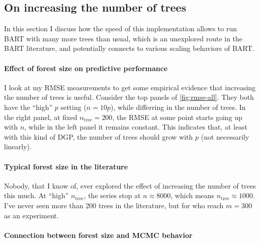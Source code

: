 \documentclass{article}
\let\oldmarginpar\marginpar
\renewcommand{\marginpar}[1]{\oldmarginpar{\sffamily\scriptsize #1}}
\renewcommand{\marginpar}[1]{\relax} %
\begin{document}
    \subsection{On increasing the number of trees}
    \label{sec:moretrees}

    In this section I discuss how the speed of this implementation allows to run BART with many more trees than usual, which is an unexplored route in the BART literature, and potentially connects to various scaling behaviors of BART.

    \paragraph{Effect of forest size on predictive performance}

    I look at my RMSE measurements to get some empirical evidence that increasing the number of trees is useful. Consider the top panels of \autoref{fig:rmse-all}. They both have the ``high'' $p$ setting ($n = 10p$), while differring in the number of trees. In the right panel, at fixed $n_\text{tree}=200$, the RMSE at some point starts going up with $n$, while in the left panel it remains constant. This indicates that, at least with this kind of DGP, the number of trees should grow with $p$ (not necessarily linearly).

    \paragraph{Typical forest size in the literature}

    Nobody, that I know of, ever explored the effect of increasing the number of trees this much. At ``high'' $n_\text{tree}$, the series stop at $n\approx 8000$, which means $n_\text{tree}\approx 1000$. I've never seen more than 200 trees in the literature, but for \citet[fig.~6, p.~286]{chipman2010} who reach $m=300$ as an experiment.

    \paragraph{Connection between forest size and MCMC behavior}
\end{document}
